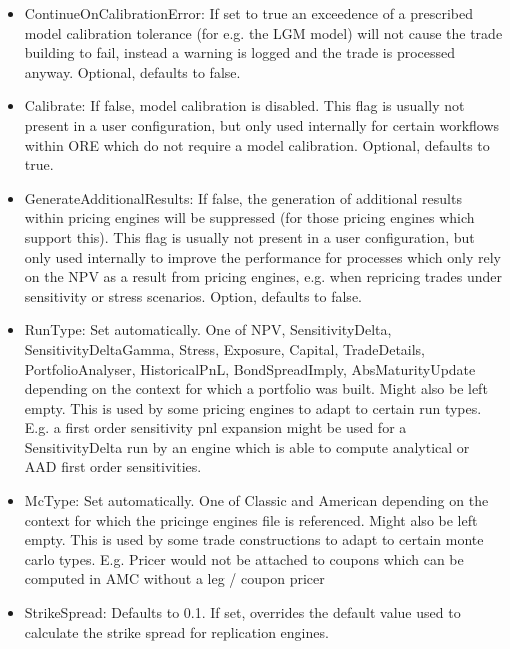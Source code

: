 \begin{itemize}
\item ContinueOnCalibrationError: If set to true an exceedence of a prescribed model calibration tolerance (for e.g. the
  LGM model) will not cause the trade building to fail, instead a warning is logged and the trade is processed
  anyway. Optional, defaults to false.
\item Calibrate: If false, model calibration is disabled. This flag is usually not present in a user configuration, but
  only used internally for certain workflows within ORE which do not require a model calibration. Optional, defaults to
  true.
\item GenerateAdditionalResults: If false, the generation of additional results within pricing engines will be
  suppressed (for those pricing engines which support this). This flag is usually not present in a user configuration,
  but only used internally to improve the performance for processes which only rely on the NPV as a result from pricing
  engines, e.g. when repricing trades under sensitivity or stress scenarios. Option, defaults to false.
\item RunType: Set automatically. One of NPV, SensitivityDelta, SensitivityDeltaGamma, Stress, Exposure, Capital,
  TradeDetails, PortfolioAnalyser, HistoricalPnL, BondSpreadImply, AbsMaturityUpdate depending on the context for which
  a portfolio was built. Might also be left empty. This is used by some pricing engines to adapt to certain run
  types. E.g. a first order sensitivity pnl expansion might be used for a SensitivityDelta run by an engine which is
  able to compute analytical or AAD first order sensitivities.
\item McType: Set automatically. One of Classic and American depending on the context for which the pricinge engines 
  file is referenced. Might also be left empty. This is used by some trade constructions to adapt to certain monte carlo
  types. E.g. Pricer would not be attached to coupons which can be computed in AMC without a leg / coupon pricer
\item StrikeSpread: Defaults to 0.1. If set, overrides the default value used to calculate the strike spread for replication engines.
\end{itemize}
